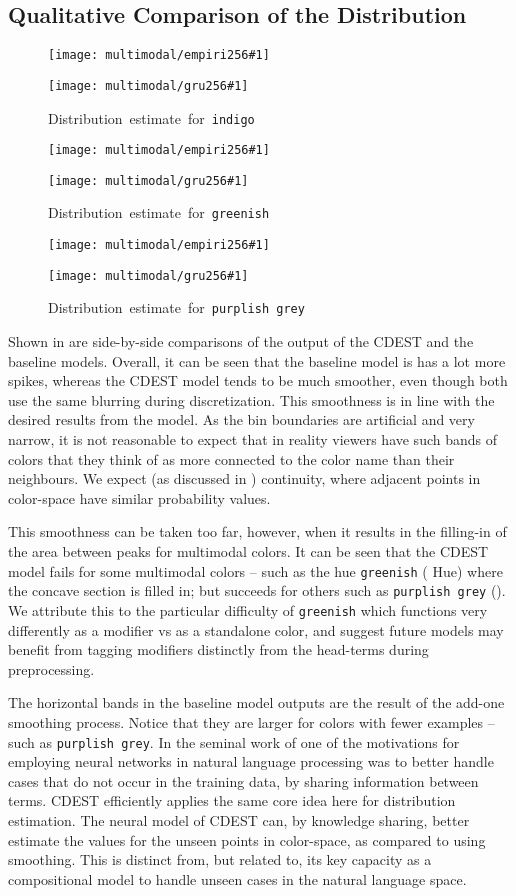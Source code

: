\documentclass[11pt,a4paper]{article}
\newcommand{\textcite}{\citet}
\begin{document}
\subsection{Qualitative Comparison of the Distribution}\label{resultsdistributions}

\newcommand{\multimodalfig}[2]{
	\begin{figure}
		\texttt{[image: multimodal/empiri256\#1]}
		
		\vspace{2mm}
		
		\texttt{[image: multimodal/gru256\#1]}	
		\caption{\label{fig#1} \mbox{Distribution estimate for \texttt{#2}}}
	\end{figure}
}

\multimodalfig{indigo}{indigo}
\multimodalfig{greenish}{greenish}
\multimodalfig{purplishgrey}{\small purplish grey}


Shown in  are side-by-side comparisons of the output of the CDEST and the baseline models.
Overall, it can be seen that the baseline model is has a lot more spikes,
whereas the CDEST model tends to be much smoother, even though both use the same blurring during discretization.
This smoothness is in line with the desired results from the model.
As the bin boundaries are artificial and very narrow, it is not reasonable to expect that in reality viewers have such bands of colors that they think of as more connected to the color name than their neighbours.
We expect  (as discussed in ) continuity, where adjacent points in color-space have similar probability values.

This smoothness can be taken too far, however, when it results in the filling-in of the area between peaks for multimodal colors.
It can be seen that the CDEST model fails for some multimodal colors -- such as the hue \texttt{greenish} ( Hue) where the concave section is filled in;
but succeeds for others such as \texttt{purplish grey} ().
We attribute this to the particular difficulty of \texttt{greenish} which functions very differently as a modifier vs as a standalone color, and suggest future models may benefit from tagging modifiers distinctly from the head-terms during preprocessing.


The horizontal bands in the baseline model outputs are the result of the add-one smoothing process.
Notice that they are larger for colors with fewer examples -- such as \texttt{purplish grey}.
In the seminal work of \textcite{NPLM} one of the motivations for employing neural networks in natural language processing was to better handle cases that do not occur in the training data, by sharing information between terms.
CDEST efficiently applies the same core idea here for distribution estimation.
The neural model of CDEST can, by knowledge sharing, better estimate the values for the unseen points in color-space, as compared to using smoothing.
This is distinct from, but related to, its key capacity as a compositional model to handle unseen cases in the natural language space. 
\end{document}

